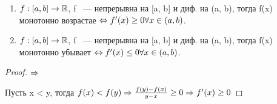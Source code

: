 \begin{theorem}{}
    \begin{enumerate}
        \item $f:[a,b] \to \mathbb{R}$, f ~--- непрерывна на [a, b] и диф. на (a, b), тогда f(x) монотонно возрастае $\Leftrightarrow f'(x) \ge 0 \forall x \in (a, b)$.
        \item $f:[a,b] \to \mathbb{R}$, f ~--- непрерывна на [a, b] и диф. на (a, b), тогда f(x) монотонно убывает $\Leftrightarrow f'(x) \le 0 \forall x \in (a, b)$.
    \end{enumerate}      
\end{theorem}

\begin{proof}
$\Rightarrow$

Пусть x < y, тогда $f(x) < f(y) \Rightarrow \frac{f(y) - f(x)}{y - x} \ge 0 \Rightarrow f'(x) \ge 0$
\end{proof}
